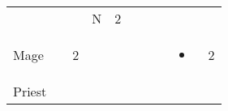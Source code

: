 \documentclass[12pt]{article}
\newcommand{\indexClass}[1]{\index{#1}}
\newcommand{\class}[1]{#1\indexClass{#1}}
\begin{document}
\begin{longtable}[]{@{}llllllllll@{}}
\begin{minipage}[t]{0.06\columnwidth}
\strut\end{minipage} &
\begin{minipage}[t]{0.06\columnwidth}\raggedright\strut
\strut\end{minipage} &
\begin{minipage}[t]{0.06\columnwidth}\raggedright\strut
\strut\end{minipage} &
\begin{minipage}[t]{0.07\columnwidth}\raggedright\strut
N
\strut\end{minipage} &
\begin{minipage}[t]{0.08\columnwidth}\raggedright\strut
2
\strut\end{minipage}\tabularnewline
\begin{minipage}[t]{0.13\columnwidth}\raggedright\strut
\class{Mage}
\strut\end{minipage} &
\begin{minipage}[t]{0.06\columnwidth}\raggedright\strut
\strut\end{minipage} &
\begin{minipage}[t]{0.06\columnwidth}\raggedright\strut
2
\strut\end{minipage} &
\begin{minipage}[t]{0.06\columnwidth}\raggedright\strut
\strut\end{minipage} &
\begin{minipage}[t]{0.06\columnwidth}\raggedright\strut
\strut\end{minipage} &
\begin{minipage}[t]{0.06\columnwidth}\raggedright\strut
\strut\end{minipage} &
\begin{minipage}[t]{0.06\columnwidth}\raggedright\strut
\strut\end{minipage} &
\begin{minipage}[t]{0.06\columnwidth}\raggedright\strut
\strut\end{minipage} &
\begin{minipage}[t]{0.07\columnwidth}\raggedright\strut
\begin{itemize}
\item
\end{itemize}
\strut\end{minipage} &
\begin{minipage}[t]{0.08\columnwidth}\raggedright\strut
2
\strut\end{minipage}\tabularnewline
\begin{minipage}[t]{0.13\columnwidth}\raggedright\strut
\class{Priest}

\end{minipage}
\end{longtable}
\end{document}
